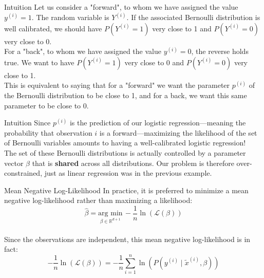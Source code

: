\begin{frame}{Intuition}
	Let us consider a "forward", to whom we have assigned the value $y^{(i)}=1$. The random variable is $Y^{(i)}$. If the associated Bernoulli distribution is well calibrated, we should have $P(Y^{(i)} = 1)$ very close to 1 and $P(Y^{(i)} = 0)$ very close to 0. \\
	\vspace{0.5cm}
	\pause
	For a "back", to whom we have assigned the value $y^{(i)}=0$, the reverse holds true. We want to have $P(Y^{(i)} = 1)$ very close to 0 and $P(Y^{(i)} = 0)$ very close to 1. \\
	\vspace{0.5cm}
	\pause
	This is equivalent to saying that for a "forward" we want the parameter $p^{(i)}$ of the Bernoulli distribution to be close to 1, and for a back, we want this same parameter to be close to 0. \\
\end{frame}

\begin{frame}{Intuition}
	Since $p^{(i)}$ is the prediction of our logistic regression—meaning the probability that observation $i$ is a forward—maximizing the likelihood of the set of Bernoulli variables amounts to having a well-calibrated logistic regression! \\
	\vspace{0.5cm}
	\pause
	The set of these Bernoulli distributions is actually controlled by a parameter vector $\beta$ that is \textbf{shared} across all distributions. Our problem is therefore over-constrained, just as linear regression was in the previous example.	
\end{frame}

\begin{frame}{Mean Negative Log-Likelihood}
	In practice, it is preferred to minimize a mean negative log-likelihood rather than maximizing a likelihood:
	\begin{equation}
		\hat{\beta} = \underset{\beta \in \mathbb{R}^{d+1}}{\text{arg min}} \, - \frac{1}{n} \ln{\left(\mathcal{L}(\beta)\right)}
		\nonumber
	\end{equation} \\
	\vspace{0.5cm}
	\pause
	Since the observations are independent, this mean negative log-likelihood is in fact:
	\begin{equation}
		- \frac{1}{n}\ln{\left(\mathcal{L}(\beta)\right)} = - \frac{1}{n} \sum_{i=1}^n \ln{\left(P(y^{(i)} \mid \tilde{x}^{(i)}, \beta)\right)}
		\nonumber
	\end{equation}
\end{frame}

